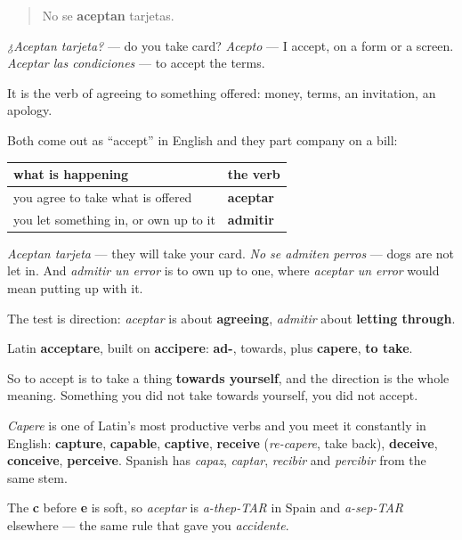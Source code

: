 \begin{quote}
No se \textbf{aceptan} tarjetas.
\end{quote}

\emph{¿Aceptan tarjeta?} — do you take card? \emph{Acepto} — I accept, on a form or a screen. \emph{Aceptar las condiciones} — to accept the terms.

It is the verb of agreeing to something offered: money, terms, an invitation, an apology.

\begin{grammarlens}[title={Grammar Lens: aceptar is not admitir}]
Both come out as \textquotedblleft{}accept\textquotedblright{} in English and they part company on a bill:

\noindent
\begin{tabularx}{\linewidth}{@{}>{\raggedright\arraybackslash}X>{\raggedright\arraybackslash}X@{}}
\toprule
\textbf{what is happening} & \textbf{the verb} \\
\midrule
you agree to take what is offered & \textbf{aceptar} \\
you let something in, or own up to it & \textbf{admitir} \\
\bottomrule
\end{tabularx}

\emph{Aceptan tarjeta} — they will take your card. \emph{No se admiten perros} — dogs are not let in. And \emph{admitir un error} is to own up to one, where \emph{aceptar un error} would mean putting up with it.

The test is direction: \emph{aceptar} is about \textbf{agreeing}, \emph{admitir} about \textbf{letting through}.
\end{grammarlens}

\begin{cousinweb}
Latin \textbf{acceptare}, built on \textbf{accipere}: \textbf{ad-}, towards, plus \textbf{capere}, \textbf{to take}.

So to accept is to take a thing \textbf{towards yourself}, and the direction is the whole meaning. Something you did not take towards yourself, you did not accept.

\emph{Capere} is one of Latin's most productive verbs and you meet it constantly in English: \textbf{capture}, \textbf{capable}, \textbf{captive}, \textbf{receive} (\emph{re-capere}, take back), \textbf{deceive}, \textbf{conceive}, \textbf{perceive}. Spanish has \emph{capaz}, \emph{captar}, \emph{recibir} and \emph{percibir} from the same stem.

The \textbf{c} before \textbf{e} is soft, so \emph{aceptar} is \emph{a-thep-TAR} in Spain and \emph{a-sep-TAR} elsewhere — the same rule that gave you \emph{accidente}.
\end{cousinweb}

